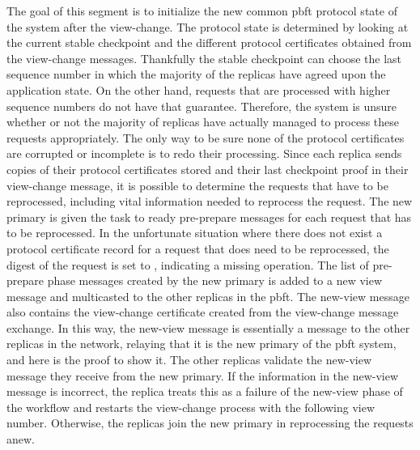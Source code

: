 \iffalse
The goal of this segment is to initialize the new common \ac{pbft} protocol state of the system after the view-change. The protocol state is determined by looking at the current stable checkpoint and the different protocol certificates obtained from the view-change messages. Thankfully the stable checkpoint can choose the last sequence number in which the majority of the replicas have agreed upon the application state. On the other hand, requests that are processed with higher sequence numbers do not have that guarantee. Therefore, the system is unsure whether or not the majority of replicas have actually managed to process these requests appropriately. The only way to be sure none of the protocol certificates are corrupted or incomplete is to redo their processing. Since each replica sends copies of their protocol certificates stored and their last checkpoint proof in their view-change message, it is possible to determine the requests that have to be reprocessed, including vital information needed to reprocess the request. The new primary is given the task to ready pre-prepare messages for each request that has to be reprocessed. In the unfortunate situation where there does not exist a protocol certificate record for a request that does need to be reprocessed, the digest of the request is set to , indicating a missing operation. The list of pre-prepare phase messages created by the new primary is added to a new view message and multicasted to the other replicas in the \ac{pbft}. The new-view message also contains the view-change certificate created from the view-change message exchange. In this way, the new-view message is essentially a message to the other replicas in the network, relaying that it is the new primary of the \ac{pbft} system, and here is the proof to show it. The other replicas validate the new-view message they receive from the new primary. If the information in the new-view message is incorrect, the replica treats this as a failure of the new-view phase of the workflow and restarts the view-change process with the following view number. Otherwise, the replicas join the new primary in reprocessing the requests anew. 

